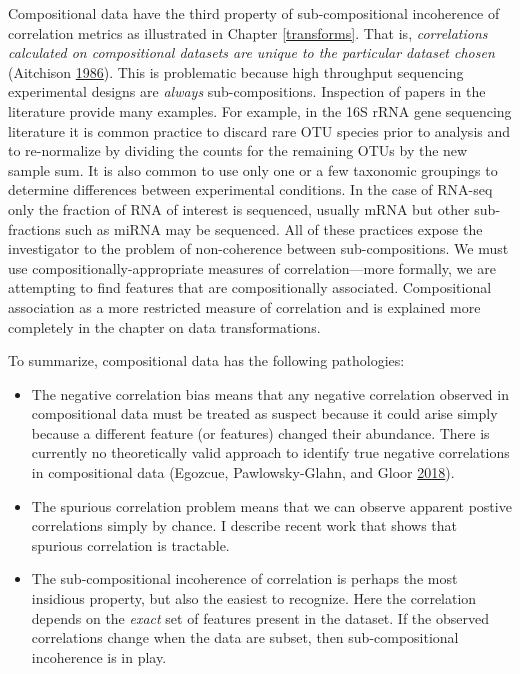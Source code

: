 \documentclass[onecolumn]{book}
\theoremstyle{definition}
\theoremstyle{definition}
\theoremstyle{definition}
\theoremstyle{remark}
\begin{document}
Compositional data have the third property of sub-compositional
incoherence of correlation metrics as illustrated in Chapter
\ref{transforms}. That is,
\emph{correlations calculated on compositional datasets are unique to the particular dataset chosen}
(Aitchison \protect\hyperlink{ref-Aitchison:1986}{1986}). This is
problematic because high throughput sequencing experimental designs are
\emph{always} sub-compositions. Inspection of papers in the literature
provide many examples. For example, in the 16S rRNA gene sequencing
literature it is common practice to discard rare OTU species prior to
analysis and to re-normalize by dividing the counts for the remaining
OTUs by the new sample sum. It is also common to use only one or a few
taxonomic groupings to determine differences between experimental
conditions. In the case of RNA-seq only the fraction of RNA of interest
is sequenced, usually mRNA but other sub-fractions such as miRNA may be
sequenced. All of these practices expose the investigator to the problem
of non-coherence between sub-compositions. We must use
compositionally-appropriate measures of correlation---more formally, we
are attempting to find features that are compositionally associated.
Compositional association as a more restricted measure of correlation
and is explained more completely in the chapter on data transformations.

To summarize, compositional data has the following pathologies:

\begin{itemize}
\item
  The negative correlation bias means that any negative correlation
  observed in compositional data must be treated as suspect because it
  could arise simply because a different feature (or features) changed
  their abundance. There is currently no theoretically valid approach to
  identify true negative correlations in compositional data (Egozcue,
  Pawlowsky-Glahn, and Gloor \protect\hyperlink{ref-egozcue:AJS}{2018}).
\item
  The spurious correlation problem means that we can observe apparent
  postive correlations simply by chance. I describe recent work that
  shows that spurious correlation is tractable.
\item
  The sub-compositional incoherence of correlation is perhaps the most
  insidious property, but also the easiest to recognize. Here the
  correlation depends on the \emph{exact} set of features present in the
  dataset. If the observed correlations change when the data are subset,
  then sub-compositional incoherence is in play.
\end{itemize}
\end{document}

